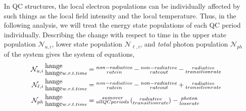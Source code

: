 \documentclass[12pt]{report}
\begin{document}
{In QC structures, the local electron populations can be individually affected by such things as the local field intensity and the local temperature.  Thus, in the following analysis, we will treat the energy state populations of each QC period individually.  Describing the change with respect to time in the upper state population $\mathcal{N}_{u,i}$, lower state population $\mathcal{N}_{\ell,i}$, and \emph{total} photon population $\mathcal{N}_{ph}$ of the system gives the system of equations,
\begin{subequations}
\label{chpt1eqn:req_words}
\begin{align}
\mathcal{N}_{u,i}\: \begin{subarray} {change}\\{w.r.t. time}\end{subarray} &= \begin{subarray}{c}{non-radiative}\\{rate in}\end{subarray} - \begin{subarray}{c}{non-radiative}\\{rate out}\end{subarray} - \begin{subarray}{c}{radiative}\\{transition rate}\end{subarray}\\
\mathcal{N}_{\ell,i}\: \begin{subarray} {change}\\{w.r.t. time}\end{subarray} &= \begin{subarray}{c}{non-radiative}\\{rate in}\end{subarray} - \begin{subarray}{c}{non-radiative}\\{rate out}\end{subarray} + \begin{subarray}{c}{radiative}\\{transition rate}\end{subarray}\\
\mathcal{N}_{ph}\: \begin{subarray} {change}\\{w.r.t. time}\end{subarray} &= \begin{subarray}{c}{sum over}\\{all QC periods}\end{subarray} \left(\begin{subarray}{c}{radiative}\\{transition rate}\end{subarray}\right) - \begin{subarray}{c}{photon}\\{loss rate}\end{subarray}

\end{align}
\end{subequations}}
\end{document}
